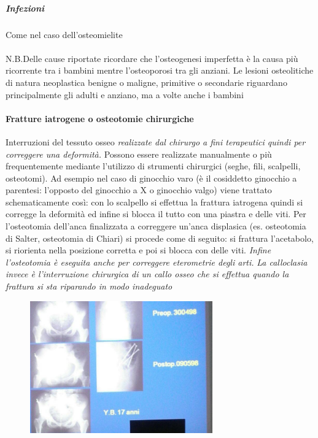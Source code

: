 \subparagraph{Infezioni}
Come nel caso dell'osteomielite
\\\\
N.B.Delle cause riportate ricordare che l'osteogenesi imperfetta è la causa più ricorrente tra i bambini mentre l'osteoporosi tra gli anziani.
Le lesioni osteolitiche di natura neoplastica benigne o maligne, primitive o secondarie riguardano principalmente gli adulti e anziano, ma a volte anche i bambini


\paragraph{Fratture iatrogene o osteotomie chirurgiche}
Interruzioni del tessuto osseo \emph{realizzate dal chirurgo a fini terapeutici quindi per correggere una deformità.} Possono essere realizzate manualmente o più frequentemente mediante l'utilizzo di strumenti chirurgici (seghe, fili, scalpelli, osteotomi). Ad esempio nel caso di ginocchio varo (è il cosiddetto ginocchio a parentesi: l'opposto del ginocchio a X o ginocchio valgo) viene trattato schematicamente così: con lo scalpello si effettua la frattura iatrogena quindi si corregge la deformità ed infine si blocca il tutto con una piastra e delle viti. Per l'osteotomia dell'anca finalizzata a correggere un'anca displasica (es. osteotomia di Salter, osteotomia di Chiari) si procede come di seguito: si frattura l'acetabolo, si riorienta nella posizione corretta e poi si blocca con delle viti. \emph{Infine l'osteotomia è eseguita anche per correggere eterometrie degli arti.} \emph{La calloclasia invece è l'interruzione chirurgica di un callo osseo che si effettua quando la frattura si sta riparando in modo inadeguato}


\begin{figure}[!ht]
\centering
\includegraphics[width=0.7\textwidth]{002/image3.png}
\end{figure}


